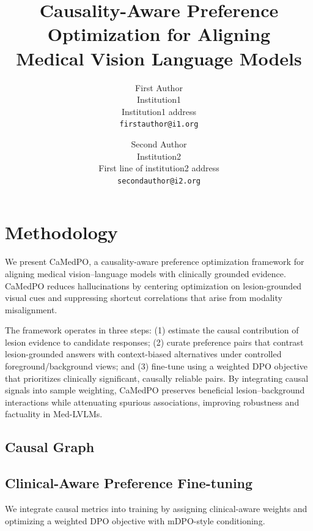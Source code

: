 \documentclass[10pt,twocolumn,letterpaper]{article}
\title{ Causality-Aware Preference Optimization for Aligning \\Medical Vision Language Models}
\author{First Author\\
Institution1\\
Institution1 address\\
{\tt\small firstauthor@i1.org}
\and
Second Author\\
Institution2\\
First line of institution2 address\\
{\tt\small secondauthor@i2.org}
}
\begin{document}
\maketitle
     
 
 
 
 
 
 
 {\small


}
 
{


\iffalse

\section{Methodology}
We present CaMedPO, a causality-aware preference optimization framework for aligning medical vision–language models with clinically grounded evidence. CaMedPO reduces hallucinations by centering optimization on lesion-grounded visual cues and suppressing shortcut correlations that arise from modality misalignment.

The framework operates in three steps: (1) estimate the causal contribution of lesion evidence to candidate responses; (2) curate preference pairs that contrast lesion-grounded answers with context-biased alternatives under controlled foreground/background views; and (3) fine-tune using a weighted DPO objective that prioritizes clinically significant, causally reliable pairs. By integrating causal signals into sample weighting, CaMedPO preserves beneficial lesion–background interactions while attenuating spurious associations, improving robustness and factuality in Med-LVLMs.

\subsection{Causal Graph}
\label{sec:causal_graph}


\subsection{Clinical-Aware Preference Fine-tuning}
We integrate causal metrics into training by assigning clinical-aware weights and optimizing a weighted DPO objective with mDPO-style conditioning.

}
\end{document}
